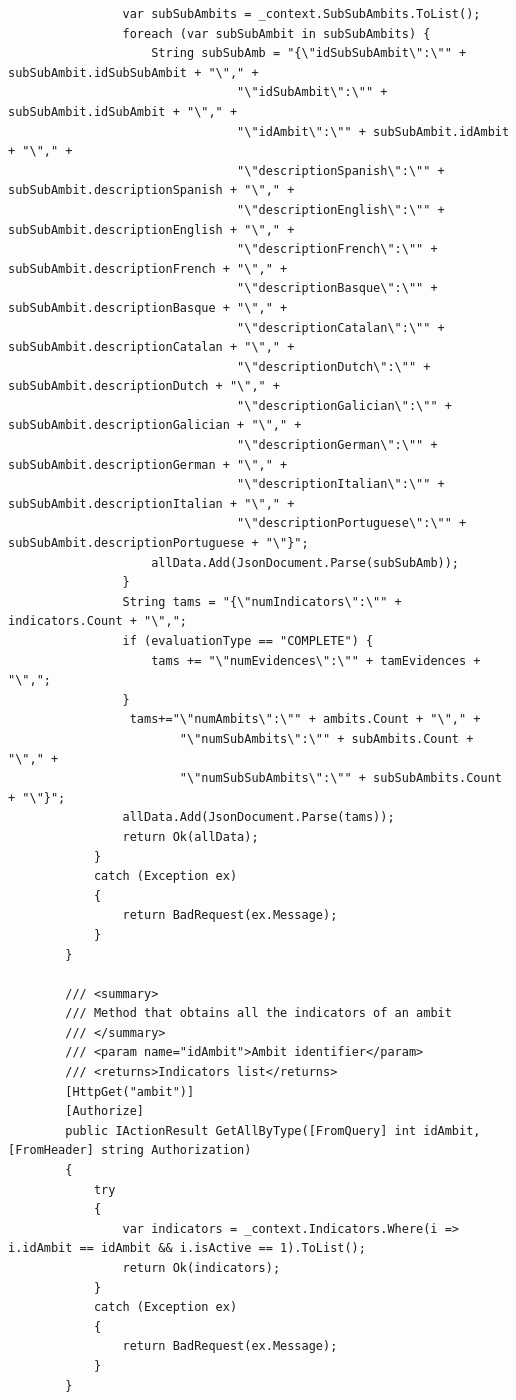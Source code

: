 \begin{itemize}
\begin{itemize}
\begin{lstlisting}
                var subSubAmbits = _context.SubSubAmbits.ToList();
                foreach (var subSubAmbit in subSubAmbits) {
                    String subSubAmb = "{\"idSubSubAmbit\":\"" + subSubAmbit.idSubSubAmbit + "\"," +
                                "\"idSubAmbit\":\"" + subSubAmbit.idSubAmbit + "\"," +
                                "\"idAmbit\":\"" + subSubAmbit.idAmbit + "\"," +
                                "\"descriptionSpanish\":\"" + subSubAmbit.descriptionSpanish + "\"," +
                                "\"descriptionEnglish\":\"" + subSubAmbit.descriptionEnglish + "\"," +
                                "\"descriptionFrench\":\"" + subSubAmbit.descriptionFrench + "\"," +
                                "\"descriptionBasque\":\"" + subSubAmbit.descriptionBasque + "\"," +
                                "\"descriptionCatalan\":\"" + subSubAmbit.descriptionCatalan + "\"," +
                                "\"descriptionDutch\":\"" + subSubAmbit.descriptionDutch + "\"," +
                                "\"descriptionGalician\":\"" + subSubAmbit.descriptionGalician + "\"," +
                                "\"descriptionGerman\":\"" + subSubAmbit.descriptionGerman + "\"," +
                                "\"descriptionItalian\":\"" + subSubAmbit.descriptionItalian + "\"," +
                                "\"descriptionPortuguese\":\"" + subSubAmbit.descriptionPortuguese + "\"}";
                    allData.Add(JsonDocument.Parse(subSubAmb));
                }
                String tams = "{\"numIndicators\":\"" + indicators.Count + "\",";
                if (evaluationType == "COMPLETE") {
                    tams += "\"numEvidences\":\"" + tamEvidences + "\",";
                }
                 tams+="\"numAmbits\":\"" + ambits.Count + "\"," +
                        "\"numSubAmbits\":\"" + subAmbits.Count + "\"," +
                        "\"numSubSubAmbits\":\"" + subSubAmbits.Count + "\"}";
                allData.Add(JsonDocument.Parse(tams));
                return Ok(allData);
            }
            catch (Exception ex)
            {
                return BadRequest(ex.Message);
            }
        }

        /// <summary>
        /// Method that obtains all the indicators of an ambit
        /// </summary>
        /// <param name="idAmbit">Ambit identifier</param>
        /// <returns>Indicators list</returns>
        [HttpGet("ambit")]
        [Authorize]
        public IActionResult GetAllByType([FromQuery] int idAmbit, [FromHeader] string Authorization)
        {
            try
            {
                var indicators = _context.Indicators.Where(i => i.idAmbit == idAmbit && i.isActive == 1).ToList();
                return Ok(indicators);
            }
            catch (Exception ex)
            {
                return BadRequest(ex.Message);
            }
        }


\end{lstlisting}
\end{itemize}
\end{itemize}
